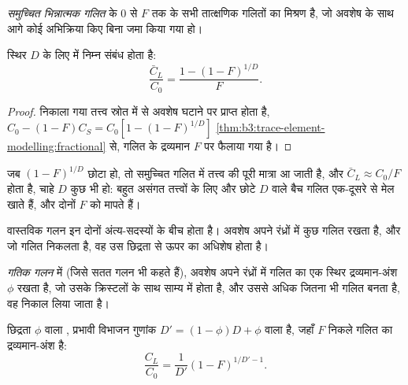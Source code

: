 \begin{definition}[समुच्चित भिन्नात्मक गलित]\label{def:b3:trace-element-modelling:fractional}
\emph{समुच्चित भिन्नात्मक गलित}  के
$0$ से $F$ तक के सभी तात्क्षणिक गलितों का मिश्रण है,
जो अवशेष के साथ आगे कोई अभिक्रिया किए बिना जमा किया गया हो।
\end{definition}

\begin{proposition}[समुच्चित गलित का संघटन]
\label{prop:b3:trace-element-modelling:aggregate}
स्थिर $D$ के लिए  में निम्न संबंध होता है:
\[
\frac{\bar C_L}{C_0} = \frac{1 - (1 - F)^{1/D}}{F}.
\]
\end{proposition}

\begin{proof}
निकाला गया तत्त्व स्रोत में से अवशेष घटाने पर प्राप्त होता है,
$C_0 - (1 - F)C_S = C_0[1 - (1 - F)^{1/D}]$ \cref{thm:b3:trace-element-modelling:fractional} से,
गलित के द्रव्यमान $F$ पर फैलाया गया है।
\end{proof}

जब $(1 - F)^{1/D}$ छोटा हो, तो समुच्चित गलित में तत्त्व की पूरी मात्रा आ जाती है, और
$\bar C_L \approx C_0/F$ होता है, चाहे $D$ कुछ भी हो: बहुत असंगत तत्त्वों के लिए
 और छोटे $D$ वाले बैच गलित एक-दूसरे से मेल खाते हैं,
और दोनों $F$ को मापते हैं।

वास्तविक गलन इन दोनों अंत्य-सदस्यों के बीच होता है। अवशेष अपने रंध्रों में कुछ गलित रखता है,
और जो गलित निकलता है, वह उस छिद्रता से ऊपर का अधिशेष होता है।

\begin{definition}[गतिक गलन]\label{def:b3:trace-element-modelling:dynamic}
\emph{गतिक गलन} में (जिसे सतत गलन भी कहते हैं),
अवशेष अपने रंध्रों में गलित का एक स्थिर द्रव्यमान-अंश $\phi$ रखता है,
जो उसके क्रिस्टलों के साथ साम्य में होता है, और उससे अधिक जितना भी गलित बनता है,
वह निकाल लिया जाता है।
\end{definition}

\begin{proposition}[गतिक गलन]\label{prop:b3:trace-element-modelling:dynamic}
छिद्रता $\phi$ वाला , प्रभावी विभाजन गुणांक $D' = (1 - \phi)D + \phi$ वाला
 है, जहाँ $F$ निकले गलित का
द्रव्यमान-अंश है:
\[
\frac{C_L}{C_0} = \frac{1}{D'}(1 - F)^{1/D' - 1}.
\]
\end{proposition}

